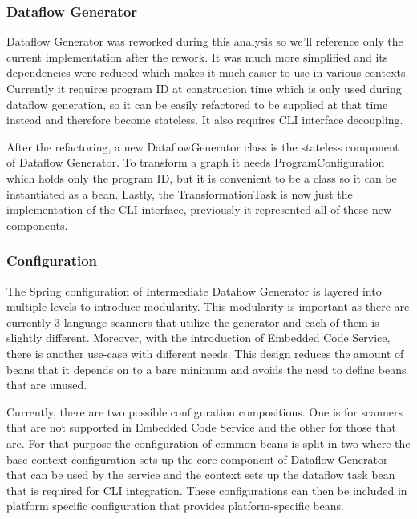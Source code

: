 \subsubsection{Dataflow Generator}
Dataflow Generator was reworked during this analysis so we’ll reference only the current implementation after the rework. It was much more simplified and its dependencies were reduced which makes it much easier to use in various contexts. Currently it requires program ID at construction time which is only used during dataflow generation, so it can be easily refactored to be supplied at that time instead and therefore become stateless. It also requires CLI interface decoupling.
\par
After the refactoring, a new DataflowGenerator class is the stateless component of Dataflow Generator. To transform a graph it needs ProgramConfiguration which holds only the program ID, but it is convenient to be a class so it can be instantiated as a bean. Lastly, the TransformationTask is now just the implementation of the CLI interface, previously it represented all of these new components.

\subsubsection{Configuration}
The Spring configuration of Intermediate Dataflow Generator is layered into multiple levels to introduce modularity. This modularity is important as there are currently 3 language scanners that utilize the generator and each of them is slightly different. Moreover, with the introduction of Embedded Code Service, there is another use-case with different needs.  This design reduces the amount of beans that it depends on to a bare minimum and avoids the need to define beans that are unused.
\par
Currently, there are two possible configuration compositions. One is for scanners that are not supported in Embedded Code Service and the other for those that are. For that purpose the configuration of common beans is split in two where the base context configuration sets up the core component of Dataflow Generator that can be used by the service and the context sets up the dataflow task bean that is required for CLI integration. These configurations can then be included in platform specific configuration that provides platform-specific beans.

